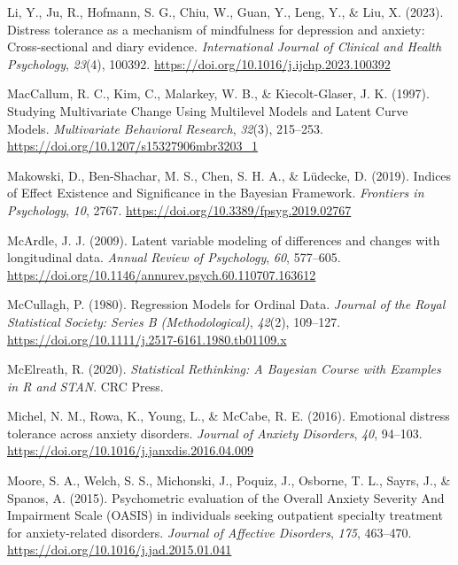 \documentclass[
  man,floatsintext]{apa7}
\newlength{\cslhangindent}
\newlength{\cslentryspacingunit} %
\newenvironment{CSLReferences}[2] %
 {%
  \setlength{\parindent}{0pt}
  \ifodd #1
  \let\oldpar\par
  \def\par{\hangindent=\cslhangindent\oldpar}
  \fi
  \setlength{\parskip}{#2\cslentryspacingunit}
 }%
 {}
\begin{document}
\begin{CSLReferences}{1}{0}
\leavevmode{}%
Li, Y., Ju, R., Hofmann, S. G., Chiu, W., Guan, Y., Leng, Y., \& Liu, X. (2023). Distress tolerance as a mechanism of mindfulness for depression and anxiety: Cross-sectional and diary evidence. \emph{International Journal of Clinical and Health Psychology}, \emph{23}(4), 100392. \url{https://doi.org/10.1016/j.ijchp.2023.100392}

\leavevmode{}%
MacCallum, R. C., Kim, C., Malarkey, W. B., \& Kiecolt-Glaser, J. K. (1997). Studying Multivariate Change Using Multilevel Models and Latent Curve Models. \emph{Multivariate Behavioral Research}, \emph{32}(3), 215--253. \url{https://doi.org/10.1207/s15327906mbr3203_1}

\leavevmode{}%
Makowski, D., Ben-Shachar, M. S., Chen, S. H. A., \& Lüdecke, D. (2019). Indices of Effect Existence and Significance in the Bayesian Framework. \emph{Frontiers in Psychology}, \emph{10}, 2767. \url{https://doi.org/10.3389/fpsyg.2019.02767}

\leavevmode{}%
McArdle, J. J. (2009). Latent variable modeling of differences and changes with longitudinal data. \emph{Annual Review of Psychology}, \emph{60}, 577--605. \url{https://doi.org/10.1146/annurev.psych.60.110707.163612}

\leavevmode{}%
McCullagh, P. (1980). Regression Models for Ordinal Data. \emph{Journal of the Royal Statistical Society: Series B (Methodological)}, \emph{42}(2), 109--127. \url{https://doi.org/10.1111/j.2517-6161.1980.tb01109.x}

\leavevmode{}%
McElreath, R. (2020). \emph{Statistical Rethinking: A Bayesian Course with Examples in R and STAN}. CRC Press.

\leavevmode{}%
Michel, N. M., Rowa, K., Young, L., \& McCabe, R. E. (2016). Emotional distress tolerance across anxiety disorders. \emph{Journal of Anxiety Disorders}, \emph{40}, 94--103. \url{https://doi.org/10.1016/j.janxdis.2016.04.009}

\leavevmode{}%
Moore, S. A., Welch, S. S., Michonski, J., Poquiz, J., Osborne, T. L., Sayrs, J., \& Spanos, A. (2015). Psychometric evaluation of the Overall Anxiety Severity And Impairment Scale (OASIS) in individuals seeking outpatient specialty treatment for anxiety-related disorders. \emph{Journal of Affective Disorders}, \emph{175}, 463--470. \url{https://doi.org/10.1016/j.jad.2015.01.041}


\end{CSLReferences}
\end{document}
